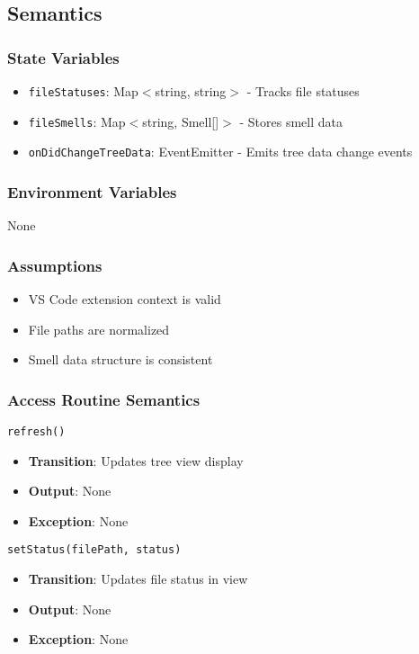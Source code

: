 \documentclass[12pt, titlepage]{article}
\begin{document}
\subsection{Semantics}

\subsubsection{State Variables}
\begin{itemize}
\item \texttt{fileStatuses}: Map$<$string, string$>$ - Tracks file statuses
\item \texttt{fileSmells}: Map$<$string, Smell[]$>$ - Stores smell data
\item \texttt{onDidChangeTreeData}: EventEmitter - Emits tree data change events
\end{itemize}

\subsubsection{Environment Variables}
None

\subsubsection{Assumptions}
\begin{itemize}
\item VS Code extension context is valid
\item File paths are normalized
\item Smell data structure is consistent
\end{itemize}

\subsubsection{Access Routine Semantics}
\texttt{refresh()}
\begin{itemize}
\item \textbf{Transition}: Updates tree view display
\item \textbf{Output}: None
\item \textbf{Exception}: None
\end{itemize}

\texttt{setStatus(filePath, status)}
\begin{itemize}
\item \textbf{Transition}: Updates file status in view
\item \textbf{Output}: None
\item \textbf{Exception}: None
\end{itemize}
\end{document}
